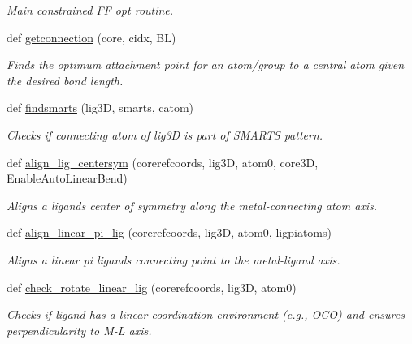 \begin{DoxyCompactItemize}
\begin{DoxyCompactList}\small\item\em Main constrained FF opt routine. \end{DoxyCompactList}\item 
def \hyperlink{namespacemolSimplify_1_1Scripts_1_1structgen_ad6bd8da07746ef83a1374c1776786c60}{getconnection} (core, cidx, BL)
\begin{DoxyCompactList}\small\item\em Finds the optimum attachment point for an atom/group to a central atom given the desired bond length. \end{DoxyCompactList}\item 
def \hyperlink{namespacemolSimplify_1_1Scripts_1_1structgen_aee6e54250dad5568a77b82c86c1b94eb}{findsmarts} (lig3D, smarts, catom)
\begin{DoxyCompactList}\small\item\em Checks if connecting atom of lig3D is part of S\+M\+A\+R\+TS pattern. \end{DoxyCompactList}\item 
def \hyperlink{namespacemolSimplify_1_1Scripts_1_1structgen_a4de00a1cf6de4864f75bdf73db1f499a}{align\+\_\+lig\+\_\+centersym} (corerefcoords, lig3D, atom0, core3D, Enable\+Auto\+Linear\+Bend)
\begin{DoxyCompactList}\small\item\em Aligns a ligand\textquotesingle{}s center of symmetry along the metal-\/connecting atom axis. \end{DoxyCompactList}\item 
def \hyperlink{namespacemolSimplify_1_1Scripts_1_1structgen_aed95f3baf72816668130eceae3c8b227}{align\+\_\+linear\+\_\+pi\+\_\+lig} (corerefcoords, lig3D, atom0, ligpiatoms)
\begin{DoxyCompactList}\small\item\em Aligns a linear pi ligand\textquotesingle{}s connecting point to the metal-\/ligand axis. \end{DoxyCompactList}\item 
def \hyperlink{namespacemolSimplify_1_1Scripts_1_1structgen_ab5c4d52d92fc35bced000f207abd08cf}{check\+\_\+rotate\+\_\+linear\+\_\+lig} (corerefcoords, lig3D, atom0)
\begin{DoxyCompactList}\small\item\em Checks if ligand has a linear coordination environment (e.\+g., O\+CO) and ensures perpendicularity to M-\/L axis. \end{DoxyCompactList}\item 

\end{DoxyCompactItemize}
